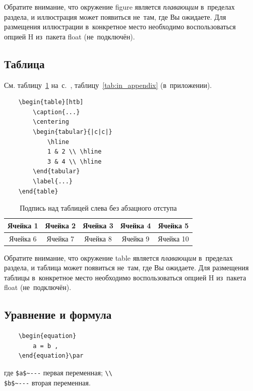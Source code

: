 \documentclass{SIBGU-state}
\begin{document}
Обратите внимание, что окружение figure является \emph{плавающим} в~пределах раздела, и иллюстрация может появиться не~там, где Вы ожидаете. Для размещения иллюстрации в~конкретное место необходимо воспользоваться опцией H из~пакета float (не~подключён).


\subsection{Таблица}

См. таблицу~\ref{tab:test_label} на~с.~\pageref{tab:test_label}, таблицу~\ref{tab:in_appendix} (в~приложении).

\begin{verbatim}
	\begin{table}[htb]
		\caption{...}
		\centering
		\begin{tabular}{|c|c|} 
			\hline
			1 & 2 \\ \hline
			3 & 4 \\ \hline
		\end{tabular}
		\label{...}
	\end{table}
\end{verbatim}

\begin{table}[htb]
	\caption{Подпись над таблицей слева без абзацного отступа}
	\centering
	\begin{tabular}{ |c|c|c|c|c| } 
		\hline
		Ячейка 1 & Ячейка 2 & Ячейка 3 & Ячейка 4 & Ячейка 5 \\ \hline
		Ячейка 6 & Ячейка 7 & Ячейка 8 & Ячейка 9 & Ячейка 10 \\ \hline
	\end{tabular}
	\label{tab:test_label}
\end{table}

Обратите внимание, что окружение table является \emph{плавающим} в~пределах раздела, и таблица может появиться не~там, где Вы ожидаете. Для размещения таблицы в~конкретное место необходимо воспользоваться опцией H из~пакета float (не~подключён).


\subsection{Уравнение и формула}

\begin{verbatim}
	\begin{equation}
		a = b ,
	\end{equation}\par
\end{verbatim}\vspace{-.5cm}
{где \verb"$a$~---" первая переменная; \verb"\\" \\
	\verb"$b$~---" вторая переменная.}\bigskip
\end{document}
